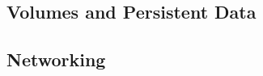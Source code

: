 

\subsection{Volumes and Persistent Data}
\label{sec::arch:volumes}

\subsection{Networking}
\label{sec::arch:net}
